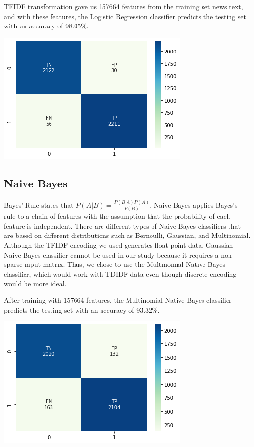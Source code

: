 \documentclass{article}
\begin{document}
\begin{multicols}{2}
TFIDF transformation gave us 157664 features from the training set news text, and with these features, the Logistic Regression classifier predicts the testing set with an accuracy of 98.05\%.
\begin{center}
\includegraphics[scale=0.45]{images/lrcm.png}
\end{center}
\subsection{Naive Bayes}
Bayes' Rule states that $P(A|B)=\frac{P(B|A)P(A)}{P(B)}$. Naive Bayes applies Bayes's rule to a chain of features with the assumption that the probability of each feature is independent. There are different types of Naive Bayes classifiers that are based on different distributions such as Bernoulli, Gaussian, and Multinomial. Although the TFIDF encoding we used generates float-point data, Gaussian Naive Bayes classifier cannot be used in our study because it requires a non-sparse input matrix. Thus, we chose to use the Multinomial Native Bayes classifier, which would work with TDIDF data even though discrete encoding would be more ideal. 

After training with 157664 features, the Multinomial Native Bayes classifier predicts the testing set with an accuracy of 93.32\%.

\begin{center}
\includegraphics[scale=0.45]{images/nbcm.png}
\end{center}


\end{multicols}
\end{document}
